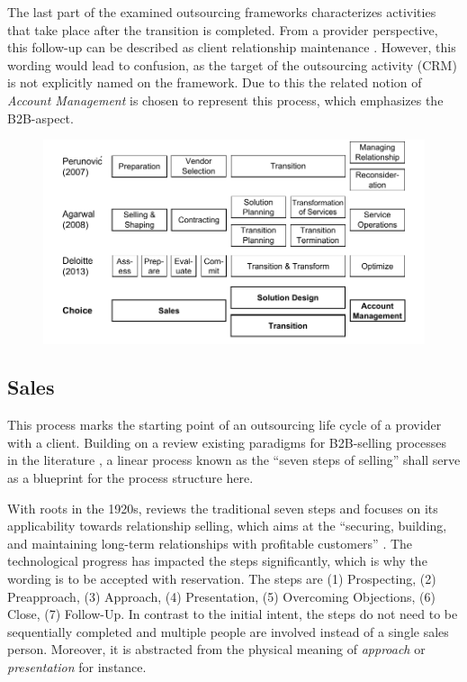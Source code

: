 	The last part of the examined outsourcing frameworks characterizes activities that take place after the transition is completed. From a provider perspective, this follow-up can be described as client relationship maintenance \citep{Moncrief_2005}. However, this wording would lead to confusion, as the target of the outsourcing activity (\viz \acrshort{CRM}) is not explicitly named on the framework. Due to this the related notion of \textit{Account Management }is chosen to represent this process, which emphasizes the B2B-aspect. 
	
	\begin{figure}[caption={Outsourcing process framework comparison}, label={fig:outsourcingprocesses}]
		{	\includegraphics[width=.95\textwidth]{figures/outsourcingprocs.pdf}}
	\end{figure} 
	
	
	\subsection{Sales}
	
	This process marks the starting point of an outsourcing life cycle of a provider with a client. Building on a review existing paradigms for B2B-selling processes in the literature \citep{_ge_2011}, a linear process known as the  \enquote{seven steps of selling} shall serve as a blueprint for the process structure here. 
	
	With roots in the 1920s, \citep{Moncrief_2005} reviews the traditional seven steps and focuses on its applicability towards relationship selling, which aims at the \enquote{securing, building, and maintaining long-term relationships with profitable customers} \citep[]{Moncrief_2005}. The technological progress has impacted the steps significantly, which is why the wording is to be accepted with reservation. The steps are (1) Prospecting, (2) Preapproach, (3) Approach, (4) Presentation, (5) Overcoming Objections, (6) Close, (7) Follow-Up. In contrast to the initial intent, the steps do not need to be sequentially completed and multiple people are involved instead of a single sales person. Moreover, it is abstracted from the physical meaning of \textit{approach} or \textit{presentation} for instance.
	
